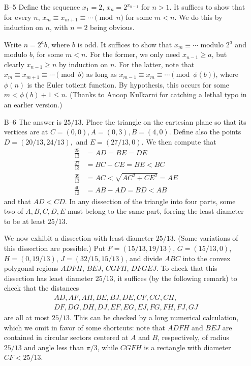 \documentclass[amssymb,twocolumn,pra,10pt,aps]{revtex4-1}
\begin{document}
\begin{itemize}
\item[B--5]
Define the sequence $x_1 = 2$, $x_n = 2^{x_{n-1}}$ for $n > 1$. It
suffices to show that for every $n$, $x_m \equiv x_{m+1} \equiv \cdots
\pmod n$ for some $m < n$. We do this by induction on $n$, with $n=2$
being obvious.

Write $n = 2^a b$, where $b$ is odd. It suffices to show that $x_m
\equiv \cdots$ modulo $2^a$ and modulo $b$, for some $m < n$. For the
former, we only need $x_{n-1} \geq a$, but clearly
$x_{n-1} \geq n$ by induction on $n$. For the latter, note that
$x_m \equiv x_{m+1} \equiv \cdots
\pmod b$ as long as $x_{m-1} \equiv x_m \equiv \cdots \pmod{\phi(b)}$,
where $\phi(n)$ is the Euler totient function. By hypothesis, this
occurs for some $m < \phi(b) + 1 \leq n$. (Thanks to Anoop Kulkarni
for catching a lethal typo in an earlier version.)

\item[B--6]
The answer is $25/13$.  Place the triangle on the cartesian plane so
that its vertices are at $C=(0,0), A=(0,3), B=(4,0)$.  Define also the points 
$D=(20/13,24/13),$ and $E=(27/13,0)$. We then compute that
\begin{align*}
\frac{25}{13} &= AD=BE=DE\\
\frac{27}{13} &= BC - CE = BE < BC \\
\frac{39}{13} &= AC < \sqrt{AC^2 + CE^2} = AE \\
\frac{40}{13} &= AB - AD = BD < AB
\end{align*}
and that $AD < CD$. In any dissection of the triangle into four parts, some two of $A,B,C,D,E$ must belong to the same part, forcing the least diameter to be at least $25/13$.

We now exhibit a dissection with least diameter $25/13$. (Some
variations of this dissection are possible.) Put $F = (15/13, 19/13)$,
$G = (15/13, 0)$, $H = (0, 19/13)$, $J = (32/15, 15/13)$,
and divide $ABC$ into the convex polygonal regions $ADFH$, $BEJ$, $CGFH$,
$DFGEJ$. 
To check that this dissection has least diameter $25/13$, it suffices (by the following remark) to check that the distances
\begin{gather*}
AD, AF, AH, BE, BJ, DE, CF, CG, CH, \\
DF, DG, DH, DJ, EF, EG, EJ, FG, FH, FJ, GJ
\end{gather*}
are all at most $25/13$. This can be checked by a long numerical calculation, which we omit in favor of some shortcuts: note that $ADFH$ and $BEJ$ are contained in
circular sectors centered at $A$ and $B$, respectively, of radius
$25/13$ and angle less than $\pi/3$, while $CGFH$ is a rectangle with diameter $CF < 25/13$.


\end{itemize}
\end{document}
